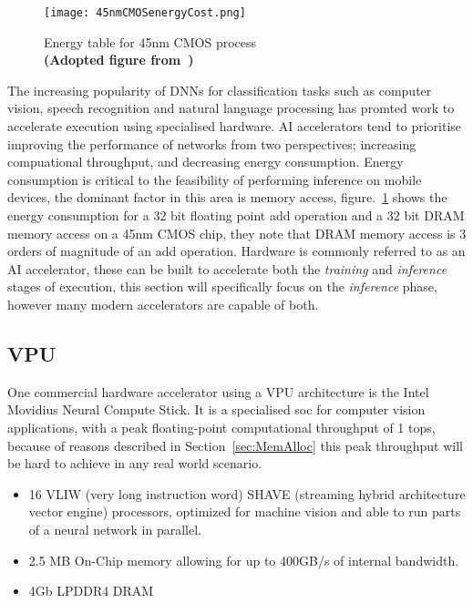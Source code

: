 \documentclass[../../D1.tex]{subfiles}
\begin{document}
 \begin{figure}[H]
    \begin{center}
        \texttt{[image: 45nmCMOSenergyCost.png]} 
    \end{center}
    
    \caption{Energy table for 45nm CMOS process\\ \textbf{(Adopted figure from~\autocite{hanLearningBothWeights2015})}}
    \label{fig:45nmCMOS}   
\end{figure}

 The increasing popularity of DNNs for classification tasks such as computer vision, speech recognition and natural language processing has promted work to accelerate execution using specialised hardware. 
 AI accelerators tend to prioritise improving the performance of networks from two perspectives; increasing compuational throughput, and decreasing energy consumption.
 Energy consumption is critical to the feasibility of performing inference on mobile devices, the dominant factor in this area is memory access, figure.~\ref{fig:45nmCMOS} shows the energy consumption for a 32 bit floating point add operation and a 32 bit DRAM memory access on a 45nm CMOS chip, they note that DRAM memory access is 3 orders of magnitude of an add operation.
 Hardware is commonly referred to as an AI accelerator, these can be built to accelerate both the \emph{training} and \emph{inference} stages of execution, this section will specifically focus on the \emph{inference} phase, however many modern accelerators are capable of both.

\subsection{VPU}
One commercial hardware accelerator using a VPU architecture is the Intel Movidius Neural Compute Stick.
It is a specialised \acrshort{soc} for computer vision applications, with a peak floating-point computational throughput of 1 \acrshort{tops}, because of reasons described in Section~\ref{sec:MemAlloc} this peak throughput will be hard to achieve in any real world scenario.

\begin{itemize}
    \item 16 VLIW (very long instruction word) SHAVE (streaming hybrid architecture vector engine) processors, optimized for machine vision and able to run parts of a neural network in parallel.
    \item 2.5 MB On-Chip memory allowing for up to 400GB/s of internal bandwidth.
    \item 4Gb LPDDR4 DRAM
\end{itemize}
\end{document}
